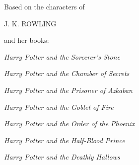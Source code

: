 \cleartoverso
\thispagestyle{empty}
\begin{center}
\vspace*{2.0cm}
Based on the characters of
\vspace*{0.5cm}\par
\Large J. K. ROWLING\normalsize\par
\vspace*{0.5cm}
and her books:\par
\vspace*{0.5cm}
\def \hpOrigSeriesBook #1{  
	\textit{Harry Potter and the #1}\smallskip\par
}
\hpOrigSeriesBook{Sorcerer’s Stone}
\hpOrigSeriesBook{Chamber of Secrets}
\hpOrigSeriesBook{Prisoner of Azkaban}
\hpOrigSeriesBook{Goblet of Fire}
\hpOrigSeriesBook{Order of the Phoenix}
\hpOrigSeriesBook{Half-Blood Prince}
\hpOrigSeriesBook{Deathly Hallows}
\end{center}
\clearpage
